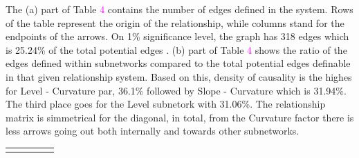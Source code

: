 \documentclass[12pt,bibliography=totoc]{article}
\begin{document}
{%

\bigskip


The (a) part of Table \textcolor{magenta}{4} contains the number of edges defined in the system. Rows of the table represent the origin of the relationship, while columns stand for the endpoints of the arrows. On 1\% significance level, the graph has 318 edges which is 25.24\% of the total potential edges . (b) part of Table \textcolor{magenta}{4} shows the ratio of the edges defined within subnetworks compared to the total potential edges definable in that given relationship system. Based on this, density of causality is the highes for Level - Curvature par, 36.1\% followed by Slope - Curvature which is 31.94\%. The third place goes for the Level subnetork with 31.06\%. The relationship matrix is simmetrical for the diagonal, in total, from the Curvature factor there is less arrows going out both internally and towards other subnetworks.



\begin{table}[H]

\fontsize{9}{9}\selectfont
\centering
\begin{subtable}[t]{0.35\textwidth}
\centering
\begin{tabular}{l | ccc  r}%
\hline\hline \\ [-1.5ex]                         %


\end{tabular}
\end{subtable}
\end{table}}
\end{document}
